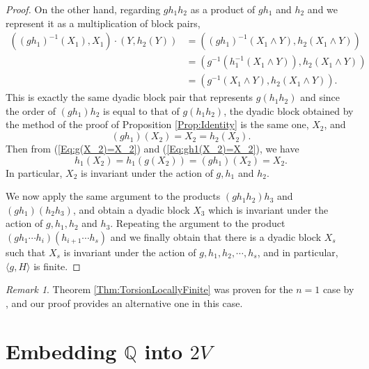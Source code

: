 \documentclass[12pt,reqno]{amsart}
\theoremstyle{plain}
\theoremstyle{definition}
\theoremstyle{remark}
\newtheorem{remark}{Remark}[section]
\numberwithin{equation}{section}
\begin{document}
\begin{proof}
	On the other hand, 
	regarding  $g h_1 h_2$  as a product of  $gh_1$  and  $h_2$  
	and we represent it as a multiplication of block pairs,
	\begin{align*} 
		((gh_1)^{-1}(X_1), X_1) \cdot (Y, h_2(Y)) 
		&  = ((gh_1)^{-1}(X_1 \wedge Y), h_2(X_1 \wedge Y)) \\
		&  = (g^{-1}(h_1^{-1}(X_1 \wedge Y)), h_2(X_1 \wedge Y)) \\
		& = (g^{-1}(X_1 \wedge Y), h_2(X_1 \wedge Y)).  
        \end{align*} 
        This is exactly the same dyadic block pair that represents  $g(h_1h_2)$  and 
        since the order of  $(gh_1)h_2$  is equal to that of  $g(h_1h_2)$, 
        the dyadic block obtained by the method of the proof of Proposition \ref{Prop:Identity}  
        is the same one, $X_2$,  and  
	\begin{equation}\label{Eq:gh1(X_2)=X_2} 
		(gh_1)(X_2) = X_2 = h_2(X_2).  
	\end{equation} 
	Then from (\ref{Eq:g(X_2)=X_2}) and (\ref{Eq:gh1(X_2)=X_2}), 
	we have 
	\begin{equation*} 
		h_1(X_2) = h_1(g(X_2)) = (gh_1)(X_2) = X_2.  
         \end{equation*} 
         In particular, 
         $X_2$  is invariant under the action of  $g, h_1$  and  $h_2$.  

	We now apply the same argument to the products  $(gh_1h_2)h_3$  and  
	$(gh_1)(h_2 h_3)$, 
	and obtain a dyadic block  $X_3$  which is invariant under 
	the action of  $g, h_1, h_2$  and $h_3$.  
	Repeating the argument to the product  $(gh_1 \cdots h_i)(h_{i+1} \cdots h_s)$  
	and we finally obtain that  
	there is a dyadic block  $X_s$  such that $X_s$ is invariant under 
	the action of  $g, h_1, h_2, \cdots, h_s$,  
	and in particular,  $\langle g, H \rangle$  is finite. 
\end{proof}  

\begin{remark}  
	Theorem \ref{Thm:TorsionLocallyFinite} was proven for the $n = 1$ case by  \cite{BCST}, 
	and our proof provides an alternative one in this case.  
\end{remark} 
 
%
%
\medskip 
\section{Embedding $\mathbb{Q}$ into $2V$}
\label{Sec:Roots} 
\end{document}
